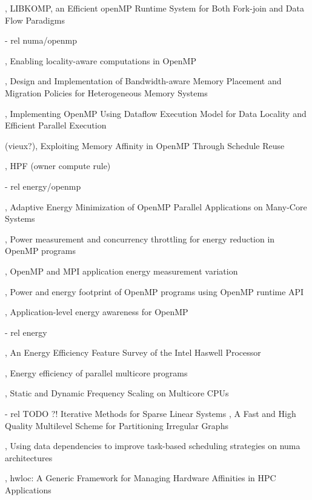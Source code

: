 \cite{Broquedis2012}, LIBKOMP, an Efficient openMP Runtime System for Both Fork-join and Data Flow Paradigms

  - rel numa/openmp

\cite{Huang2010}, Enabling locality-aware computations in OpenMP

\cite{Yu2017}, Design and Implementation of Bandwidth-aware Memory Placement and Migration Policies for Heterogeneous Memory Systems

\cite{Weng2002}, Implementing OpenMP Using Dataflow Execution Model for Data Locality and Efficient Parallel Execution

(vieux?)\cite{Nikolopoulos2001}, Exploiting Memory Affinity in OpenMP Through Schedule Reuse

\cite{HPF}, HPF (owner compute rule)

  - rel energy/openmp

\cite{Shafik2015}, Adaptive Energy Minimization of OpenMP Parallel Applications on Many-Core Systems

\cite{Porterfield2013}, Power measurement and concurrency throttling for energy reduction in OpenMP programs

\cite{Porterfield2013a}, OpenMP and MPI application energy measurement variation

\cite{Nandamuri2015}, Power and energy footprint of OpenMP programs using OpenMP runtime API

\cite{Alessi2015}, Application-level energy awareness for OpenMP

  - rel energy

\cite{Hackenberg2015}, An Energy Efficiency Feature Survey of the Intel Haswell Processor

\cite{Davidovic2015}, Energy efficiency of parallel multicore programs

\cite{Bao2016}, Static and Dynamic Frequency Scaling on Multicore CPUs

 - rel TODO ?!
\cite{Saad2013} Iterative Methods for Sparse Linear Systems
\cite{Karypis1998}, A Fast and High Quality Multilevel Scheme for Partitioning Irregular Graphs




%
\cite{Virouleau2016b}, Using data dependencies to improve task-based scheduling strategies on numa architectures

\cite{Broquedis2010}, hwloc: {A} Generic Framework for Managing Hardware Affinities in {HPC} Applications

